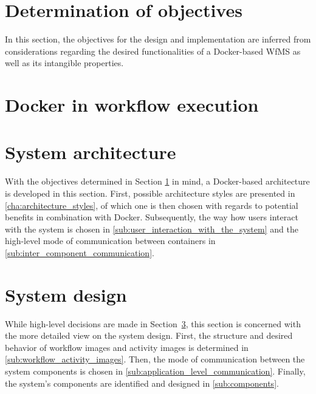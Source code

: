 \documentclass[language=english,noinputenc]{wiwwuwordrprt}
\begin{document}
    \section{Determination of objectives} %
      \label{sec:determination_of_objectives}

      In this section, the objectives for the design and implementation are inferred from considerations regarding the desired functionalities of a Docker-based \ac{WfMS} as well as its intangible properties.

      

    \section{Docker in workflow execution} %
      \label{sec:docker_for_wf_execution}
      

    \section{System architecture} %
      \label{sec:architecture}

      With the objectives determined in Section \ref{sec:determination_of_objectives} in mind, a Docker-based architecture is developed in this section. First, possible architecture styles are presented in \ref{cha:architecture_styles}, of which one is then chosen with regards to potential benefits in combination with Docker. Subsequently, the way how users interact with the system is chosen in \ref{sub:user_interaction_with_the_system} and the high-level mode of communication between containers in \ref{sub:inter_component_communication}.

      

    \section{System design} %
      \label{sec:design}

      While high-level decisions are made in Section~\ref{sec:architecture}, this section is concerned with the more detailed view on the system design.
      First, the structure and desired behavior of workflow images and activity images is determined in \ref{sub:workflow_activity_images}. Then, the mode of communication between the system components is chosen in \ref{sub:application_level_communication}. Finally, the system's components are identified and designed in \ref{sub:components}.
\end{document}
